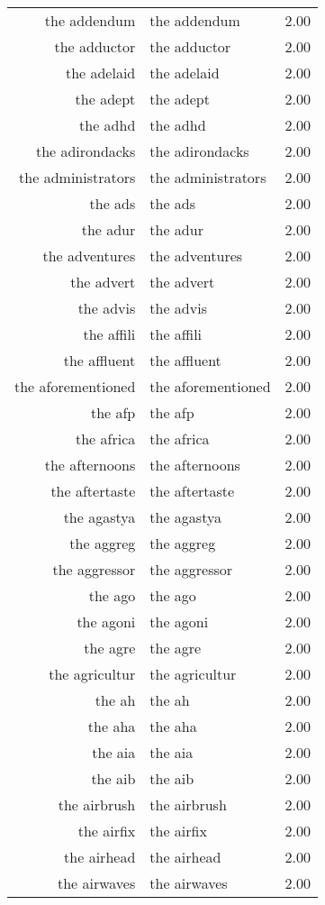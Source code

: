 \begin{table}[ht]
\begin{tabular}{rlr}
  the addendum & the addendum & 2.00 \\ 
  the adductor & the adductor & 2.00 \\ 
  the adelaid & the adelaid & 2.00 \\ 
  the adept & the adept & 2.00 \\ 
  the adhd & the adhd & 2.00 \\ 
  the adirondacks & the adirondacks & 2.00 \\ 
  the administrators & the administrators & 2.00 \\ 
  the ads & the ads & 2.00 \\ 
  the adur & the adur & 2.00 \\ 
  the adventures & the adventures & 2.00 \\ 
  the advert & the advert & 2.00 \\ 
  the advis & the advis & 2.00 \\ 
  the affili & the affili & 2.00 \\ 
  the affluent & the affluent & 2.00 \\ 
  the aforementioned & the aforementioned & 2.00 \\ 
  the afp & the afp & 2.00 \\ 
  the africa & the africa & 2.00 \\ 
  the afternoons & the afternoons & 2.00 \\ 
  the aftertaste & the aftertaste & 2.00 \\ 
  the agastya & the agastya & 2.00 \\ 
  the aggreg & the aggreg & 2.00 \\ 
  the aggressor & the aggressor & 2.00 \\ 
  the ago & the ago & 2.00 \\ 
  the agoni & the agoni & 2.00 \\ 
  the agre & the agre & 2.00 \\ 
  the agricultur & the agricultur & 2.00 \\ 
  the ah & the ah & 2.00 \\ 
  the aha & the aha & 2.00 \\ 
  the aia & the aia & 2.00 \\ 
  the aib & the aib & 2.00 \\ 
  the airbrush & the airbrush & 2.00 \\ 
  the airfix & the airfix & 2.00 \\ 
  the airhead & the airhead & 2.00 \\ 
  the airwaves & the airwaves & 2.00 \\ 

\end{tabular}
\end{table}
